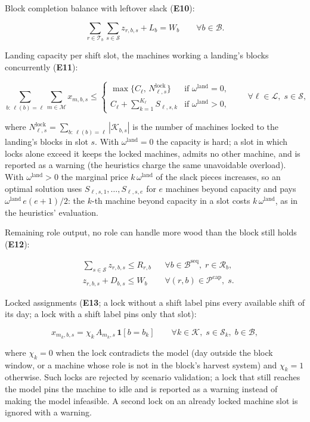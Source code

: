 Block completion balance with leftover slack (\textbf{E10}):

\[
\sum_{r\in\mathcal{T}_b}\sum_{s\in\mathcal{S}} z_{r,b,s} + L_b = W_b
\qquad \forall b\in\mathcal{B}.
\]

Landing capacity per shift slot, the machines working a landing's blocks
concurrently (\textbf{E11}):

\[
\sum_{b:\,\ell(b)=\ell}\sum_{m\in\mathcal{M}} x_{m,b,s}
\le
\begin{cases}
\max\{C_{\ell},\, N^{\text{lock}}_{\ell,s}\} & \text{if } \omega^{\text{land}} = 0,\\
C_{\ell} + \sum_{k=1}^{K_{\ell}} S_{\ell,s,k} & \text{if } \omega^{\text{land}} > 0,
\end{cases}
\qquad \forall \ell\in\mathcal{L},\; s\in\mathcal{S},
\]

where
\(N^{\text{lock}}_{\ell,s} = \sum_{b:\,\ell(b)=\ell}|\mathcal{K}_{b,s}|\)
is the number of machines locked to the landing's blocks in slot \(s\).
With \(\omega^{\text{land}}=0\) the capacity is hard; a slot in which
locks alone exceed it keeps the locked machines, admits no other
machine, and is reported as a warning (the heuristics charge the same
unavoidable overload). With \(\omega^{\text{land}}>0\) the marginal
price \(k\,\omega^{\text{land}}\) of the slack pieces increases, so an
optimal solution uses \(S_{\ell,s,1},\dots,S_{\ell,s,e}\) for \(e\)
machines beyond capacity and pays \(\omega^{\text{land}}\,e(e+1)/2\):
the \(k\)-th machine beyond capacity in a slot costs
\(k\,\omega^{\text{land}}\), as in the heuristics' evaluation.

Remaining role output, no role can handle more wood than the block still
holds (\textbf{E12}):

\[
\begin{aligned}
&\sum_{s\in\mathcal{S}} z_{r,b,s} \le R_{r,b}
&& \forall b\in\mathcal{B}^{\text{seq}},\; r\in\mathcal{R}_b,\\
&z_{r,b,s} + D_{b,s} \le W_b
&& \forall (r,b)\in\mathcal{P}^{\text{cap}},\; s.
\end{aligned}
\]

Locked assignments (\textbf{E13}; a lock without a shift label pins
every available shift of its day; a lock with a shift label pins only
that slot):

\[
x_{m_k,b,s} = \chi_k\,A_{m_k,s}\,\mathbf{1}[b=b_k]
\qquad \forall k\in\mathcal{K},\; s\in\mathcal{S}_k,\; b\in\mathcal{B},
\]

where \(\chi_k=0\) when the lock contradicts the model (day outside the
block window, or a machine whose role is not in the block's harvest
system) and \(\chi_k=1\) otherwise. Such locks are rejected by scenario
validation; a lock that still reaches the model pins the machine to idle
and is reported as a warning instead of making the model infeasible. A
second lock on an already locked machine slot is ignored with a warning.


